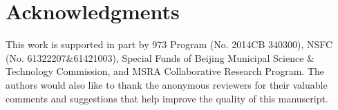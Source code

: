 \documentclass[10pt,journal,compsoc,twoside]{IEEEtran}
\newcounter{definition}[section]
\newcounter{alg}[section]
\begin{document}
%














\section*{Acknowledgments}
This work is supported in part by  973 Program ({\small No. 2014CB 340300}), NSFC ({\small No. 61322207\&61421003}), Special Funds of Beijing Municipal Science \& Technology Commission, and MSRA Collaborative Research Program.  The authors would also like to thank the anonymous reviewers for their valuable comments and suggestions that help improve the quality of this manuscript.




%
%
%
\end{document}
